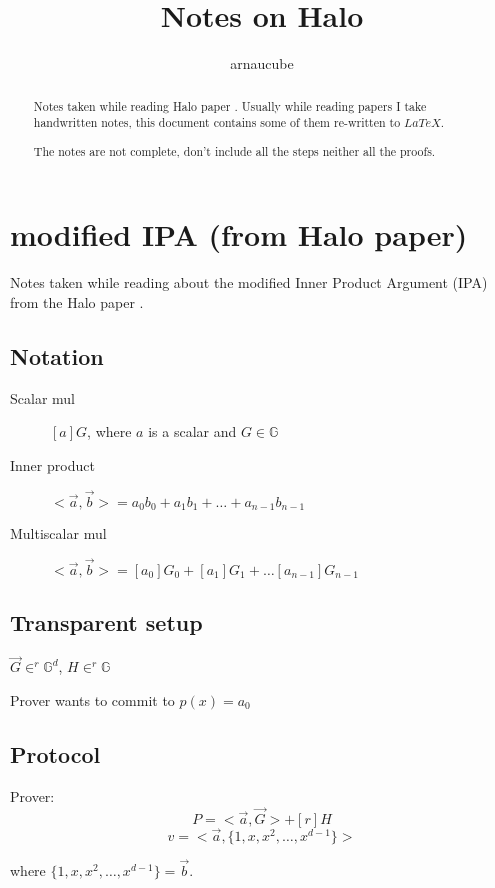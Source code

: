 \documentclass{article}
\title{Notes on Halo}
\author{arnaucube}
\date{}
\theoremstyle{definition}
\begin{document}
\maketitle

\begin{abstract}
	Notes taken while reading Halo paper \cite{cryptoeprint:2019/1021}. Usually while reading papers I take handwritten notes, this document contains some of them re-written to $LaTeX$.

	The notes are not complete, don't include all the steps neither all the proofs.
\end{abstract}

\tableofcontents

\section{modified IPA (from Halo paper)}
Notes taken while reading about the modified Inner Product Argument (IPA) from the Halo paper \cite{cryptoeprint:2019/1021}.

\subsection{Notation}
\begin{description}
    \item[Scalar mul] $[a]G$, where $a$ is a scalar and $G \in \mathbb{G}$
    \item[Inner product] $<\overrightarrow{a}, \overrightarrow{b}> = a_0 b_0 + a_1 b_1 + \ldots + a_{n-1} b_{n-1}$
    \item[Multiscalar mul] $<\overrightarrow{a}, \overrightarrow{b}> = [a_0] G_0 + [a_1] G_1 + \ldots [a_{n-1}] G_{n-1}$
\end{description}


\subsection{Transparent setup}
$\overrightarrow{G} \in^r \mathbb{G}^d$, $H \in^r \mathbb{G}$

Prover wants to commit to $p(x)=a_0$
\subsection{Protocol}
Prover:
$$P=<\overrightarrow{a}, \overrightarrow{G}> + [r]H$$
$$v=<\overrightarrow{a}, \{1, x, x^2, \ldots, x^{d-1} \} >$$

where $\{1, x, x^2, \ldots, x^{d-1} \} = \overrightarrow{b}$.
\end{document}
